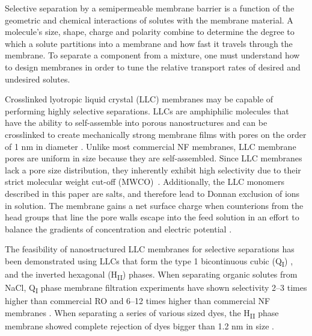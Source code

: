 \documentclass[journal=jpcbfk,manuscript=article]{achemso}
\begin{document}
  Selective separation by a semipermeable membrane barrier is a function of the
  geometric and chemical interactions of solutes with the membrane material. A
  molecule's size, shape, charge and polarity combine to determine the degree to
  which a solute partitions into a membrane and how fast it travels through the
  membrane. To separate a component from a mixture, one must understand how to
  design membranes in order to tune the relative transport rates of desired and
  undesired solutes\cite{gin_polymerized_2008,wijmans_solution-diffusion_1995}. 


  Crosslinked lyotropic liquid crystal (LLC) membranes may be capable of
  performing highly selective separations. LLCs are amphiphilic molecules that
  have the ability to self-assemble into porous nanostructures
  \cite{smith_ordered_1997} and can be crosslinked to create mechanically
  strong membrane films with pores on the order of 1 nm in diameter
  \cite{zhou_supported_2005}. Unlike most commercial NF membranes, LLC membrane pores
  are uniform in size because they are self-assembled. 
  Since LLC membranes lack a pore size distribution, they
  inherently exhibit high selectivity due to their strict molecular weight
  cut-off (MWCO)~\cite{zhou_supported_2005}. Additionally, the LLC monomers
  described in this paper are salts, and therefore lead to Donnan exclusion of ions
  in solution. The membrane gains a net surface charge when counterions from the head
  groups that line the pore walls escape into the feed solution in an effort to balance 
  the gradients of concentration and electric potential \cite{donnan_theory_1995}.    

  The feasibility of nanostructured LLC membranes for selective separations has been
  demonstrated using LLCs that form the type 1 bicontinuous cubic (Q\textsubscript{I})
  \cite{hatakeyama_water_2011,hatakeyama_nanoporous_2010,carter_glycerol-based_2012},
  and the inverted hexagonal (H\textsubscript{II}) \cite{zhou_supported_2005}
  phases. When 
  separating organic solutes from NaCl, Q\textsubscript{I} phase membrane filtration
  experiments have shown selectivity 2--3 times higher than commercial RO and
  6--12 times higher than commercial NF membranes \cite{dischinger_application_2017}.
  When separating a series of various sized dyes, the H\textsubscript{II} phase membrane
  showed complete rejection of dyes bigger than 1.2 nm in size \cite{zhou_supported_2005}. 
\end{document}
